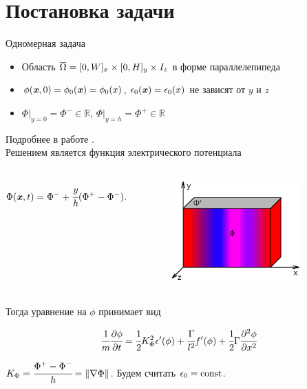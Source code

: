 
\section{Постановка задачи}

\begin{frame}{Одномерная задача}
\vspace{-0.3cm}
\begin{itemize}
	\item Область ${\overline{\Omega}} = [0, W]_x \times [0, H]_y \times I_z$ в форме параллелепипеда
	\item $\phi({\textbf{\textit{x}}}, 0) = \phi_0({\textbf{\textit{x}}}) = \phi_0(x)$, $\epsilon_0({\textbf{\textit{x}}}) = \epsilon_0(x)$ не зависят от $y$ и $z$
	\item $\Phi|_{y = 0} = \Phi^- \in \mathbb{R}$, $\Phi|_{y = h} = \Phi^+ \in \mathbb{R}$
\end{itemize}
Подробнее в работе \cite{ponomarev_stability}. \\[0.3cm]
Решением является функция электрического потенциала
\begin{columns}
	\vspace{-1cm}
	$$\Phi(\vx, t) = \Phi^- \hm + \cfrac{y}{h}(\Phi^+ - \Phi^-).$$
	\begin{figure}
		\vspace*{-2.3cm}
		\hspace*{0.5cm}
		\includegraphics[width=0.85\textwidth]{figures/one_dim_problem.jpg}
	\end{figure}
\end{columns}
\vspace{-0.4cm}
Тогда уравнение на $\phi$ принимает вид
\begin{block}{}
	$$\cfrac{1}{m} \cfrac{\partial \phi}{\partial t} = \cfrac{1}{2} K_\Phi^2 \epsilon'(\phi) + \cfrac{\Gamma}{l^2} f'(\phi) + \cfrac{1}{2} \Gamma \cfrac{\partial^2 \phi}{\partial x^2}$$
\end{block}
$K_\Phi = \cfrac{\Phi^+ - \Phi^-}{h} = \| \nabla \Phi \|$. Будем считать $\epsilon_0 = \operatorname{{const}}$.
\end{frame}


